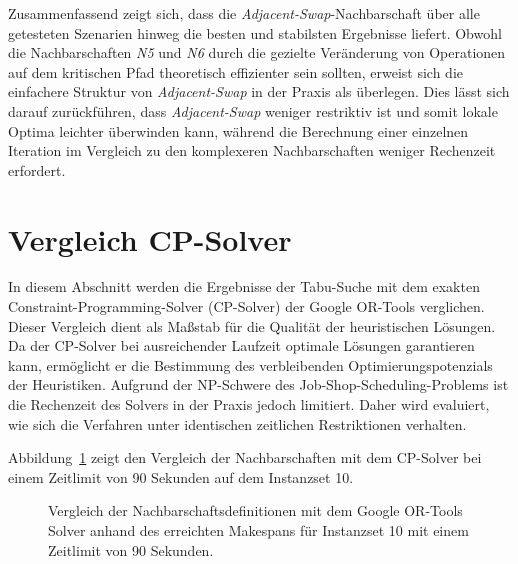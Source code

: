 Zusammenfassend zeigt sich, dass die \emph{Adjacent-Swap}-Nachbarschaft über alle getesteten Szenarien hinweg die besten und stabilsten Ergebnisse liefert.
Obwohl die Nachbarschaften \emph{N5} und \emph{N6} durch die gezielte Veränderung von Operationen auf dem kritischen Pfad theoretisch effizienter sein sollten, erweist sich die einfachere Struktur von \emph{Adjacent-Swap} in der Praxis als überlegen.
Dies lässt sich darauf zurückführen, dass \emph{Adjacent-Swap} weniger restriktiv ist und somit lokale Optima leichter überwinden kann, während die Berechnung einer einzelnen Iteration im Vergleich zu den komplexeren Nachbarschaften weniger Rechenzeit erfordert.

\section{Vergleich CP-Solver}
\label{sec:cpsolver_vergleich}

In diesem Abschnitt werden die Ergebnisse der Tabu-Suche mit dem exakten Constraint-Programming-Solver (CP-Solver) der Google OR-Tools verglichen.
Dieser Vergleich dient als Maßstab für die Qualität der heuristischen Lösungen.
Da der CP-Solver bei ausreichender Laufzeit optimale Lösungen garantieren kann, ermöglicht er die Bestimmung des verbleibenden Optimierungspotenzials der Heuristiken.
Aufgrund der NP-Schwere des Job-Shop-Scheduling-Problems ist die Rechenzeit des Solvers in der Praxis jedoch limitiert.
Daher wird evaluiert, wie sich die Verfahren unter identischen zeitlichen Restriktionen verhalten.

Abbildung~\ref{fig:or_comparison_90} zeigt den Vergleich der Nachbarschaften mit dem CP-Solver bei einem Zeitlimit von 90 Sekunden auf dem Instanzset 10.

\begin{figure}[H]
    \centering
    
    \caption{Vergleich der Nachbarschaftsdefinitionen mit dem Google OR-Tools Solver anhand des erreichten Makespans für Instanzset 10 mit einem Zeitlimit von 90 Sekunden.}
    \label{fig:or_comparison_90}
\end{figure}

